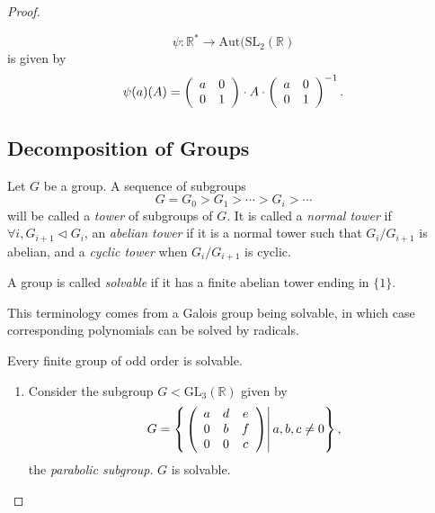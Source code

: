 \begin{proof}
\begin{xmpl}
\begin{enumerate}
{        $$
        \psi : \mathbb{R}^*
           \to \mathrm{Aut}(\mathrm{SL}_2(\mathbb{R})
        $$
        is given by
        $$
        \psi(a)(A) =
          \left(\begin{array}{c c}
            a & 0 \\ 0 & 1
          \end{array}\right) \cdot A \cdot
          \left(\begin{array}{c c}
            a & 0 \\ 0 & 1
          \end{array}\right)^{-1}.
          $$
       }
\end{enumerate}
\end{xmpl}

\subsection{Decomposition of Groups}

\begin{defn}
Let $G$ be a group. A sequence of subgroups
$$
G = G_0 > G_1 > \cdots > G_i > \cdots
$$
will be called a \emph{tower} of subgroups of $G$.
It is called a \emph{normal tower} if
$\forall i, G_{i+1} \triangleleft G_i$, an
\emph{abelian tower} if it is a normal tower such that
$G_{i} / G_{i+1}$ is abelian, and a \emph{cyclic tower}
when $G_{i} / G_{i+1}$ is cyclic.
\end{defn}

\begin{defn}
A group is called \emph{solvable} if it has a finite
abelian tower ending in $\{ 1 \}$.
\end{defn}

This terminology comes from a Galois group being solvable, in which
case corresponding polynomials can be solved by radicals.

\begin{theorem}
  Every finite group of odd order is solvable.
\end{theorem}

\begin{xmpl}
\begin{enumerate}
  \item{Consider the subgroup $G < \mathrm{GL}_3(\mathbb{R})$ given by
      $$
      G = \left\{\left.
          \left(\begin{array}{c c c}
            a & d & e \\ 0 & b & f \\ 0 & 0 & c
          \end{array}\right)\right|a, b, c \neq 0\right\},
      $$
      the \emph{parabolic subgroup}. $G$ is solvable.

}
\end{enumerate}
\end{xmpl}
\end{proof}
